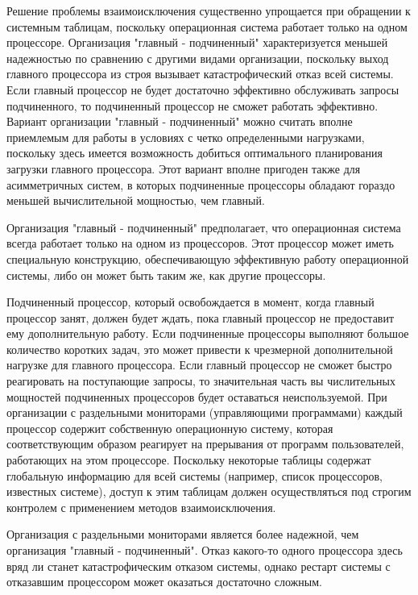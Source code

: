 Решение проблемы взаимоисключения существенно упрощается при обращении к системным таблицам, поскольку операционная система работает только на одном процессоре. Организация "главный - подчиненный" характеризуется меньшей надежностью по сравнению с другими видами организации, поскольку выход главного процессора из строя вызывает катастрофический отказ всей системы. Если главный процессор не будет достаточно эффективно обслуживать запросы подчиненного, то подчиненный процессор не сможет работать эффективно. Вариант организации "главный - подчиненный" можно считать вполне приемлемым для работы в условиях с четко определенными нагрузками, поскольку здесь имеется возможность добиться оптимального планирования загрузки главного процессора. Этот вариант вполне пригоден также для асимметричных систем, в которых подчиненные процессоры обладают гораздо меньшей вычислительной мощностью, чем главный.

Организация "главный - подчиненный" предполагает, что операционная система всегда работает только на одном из процессоров. Этот процессор может иметь специальную конструкцию, обеспечивающую эффективную работу операционной системы, либо он может быть таким же, как другие процессоры.

Подчиненный процессор, который освобождается в момент, когда главный процессор занят, должен будет ждать, пока главный процессор не предоставит ему дополнительную работу. Если подчиненные процессоры выполняют большое количество коротких задач, это может привести к чрезмерной дополнительной нагрузке для главного процессора. Если главный процессор не сможет быстро реагировать на поступающие запросы, то значительная часть вы числительных мощностей подчиненных процессоров будет оставаться неиспользуемой. При организации с раздельными мониторами (управляющими программами) каждый процессор содержит собственную операционную систему, которая соответствующим образом реагирует на прерывания от программ пользователей, работающих на этом процессоре. Поскольку некоторые таблицы содержат глобальную информацию для всей системы (например, список процессоров, известных системе), доступ к этим таблицам должен осуществляться под строгим контролем с применением методов взаимоисключения.

Организация с раздельными мониторами является более надежной, чем организация "главный - подчиненный". Отказ какого-то одного процессора здесь вряд ли станет катастрофическим отказом системы, однако рестарт системы с отказавшим процессором может оказаться достаточно сложным.

